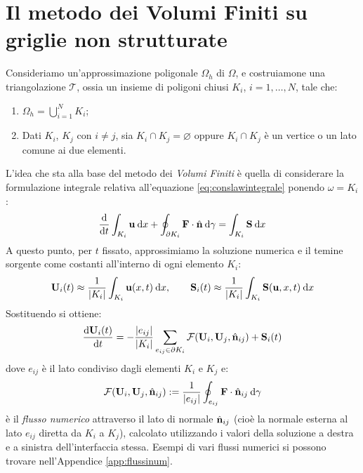 \section{Il metodo dei Volumi Finiti su griglie non strutturate}
Consideriamo un'approssimazione poligonale $\Omega_h$ di $\Omega$, e costruiamone una triangolazione $\mathcal{T}$, ossia un insieme di poligoni chiusi $K_i$, $i=1,\ldots,N$, tale che:
\begin{enumerate}
\item $\Omega_h = \bigcup_{i=1}^N K_i$;
\item Dati $K_i$, $K_j$ con $i\neq j$, sia $K_i \cap K_j = \varnothing$ oppure $K_i \cap K_j$ è un vertice o un lato comune ai due elementi.
\end{enumerate}

L'idea che sta alla base del metodo dei \emph{Volumi Finiti} è quella di considerare la formulazione integrale relativa all'equazione \eqref{eq:conslawintegrale} ponendo $\omega = K_i$:
\begin{equation*}
\ddt{} \int_{K_i} \mathbf u \: \dd{x} + \oint_{\partial K_i} \Flux \cdot \nn \: \dd{\gamma}
= \int_{K_i} \mathbf S \: \dd{x}
\end{equation*}
A questo punto, per $t$ fissato, approssimiamo la soluzione numerica e il temine sorgente come costanti all'interno di ogni elemento $K_{i}$:
\begin{equation*}
\mathbf{U}_i(t) \approx \frac{1}{\left| K_i \right|} \int_{K_i} \mathbf u(x,t) \: \mathrm{d}x, \qquad
\mathbf{S}_i(t) \approx \frac{1}{\left| K_i \right|} \int_{K_i} \mathbf S(\mathbf{u},x,t) \: \mathrm{d}x
\end{equation*}
Sostituendo si ottiene:
\begin{equation} \label{eq:odefvm}
\frac{\mathrm{d}\mathbf{U}_i(t)}{\mathrm{d}t} = - \frac{\left| e_{ij} \right|}{\left| K_i \right|} \sum_{e_{ij} \in \partial K_i} \mathbf{\mathcal{F}}(\mathbf U_i, \mathbf U_j, \hat{\mathbf{n}}_{ij}) + \mathbf{S}_i(t)
\end{equation}
dove $e_{ij}$ è il lato condiviso dagli elementi $K_i$ e $K_j$ e:
\begin{equation*}
\mathbf{\mathcal{F}}(\mathbf U_i, \mathbf U_j, \hat{\mathbf{n}}_{ij}) := \frac{1}{\left| e_{ij} \right|} \oint_{e_{ij}} \mathbf{F} \cdot \hat{\mathbf{n}}_{ij} \: \mathrm{d}\gamma
\end{equation*}
è il \emph{flusso numerico} attraverso il lato di normale $\hat{\mathbf{n}}_{ij}$ (cioè la normale esterna al lato $e_{ij}$ diretta da $K_i$ a $K_j$), calcolato utilizzando i valori della soluzione a destra e a sinistra dell'interfaccia stessa. Esempi di vari flussi numerici si possono trovare nell'Appendice \ref{app:flussinum}.

